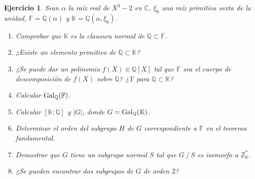 \documentclass[11pt]{report}
\newcommand{\Z}{\mathbb Z}
\newcommand{\Q}{\mathbb Q}
\newcommand{\C}{\mathbb C}
\newcommand{\F}{\mathbb F}
\newcommand{\K}{\mathbb K}
\newtheorem{ejercicio}{Ejercicio}
\begin{document}
\begin{ejercicio}
    Sean $\alpha$ la raíz real de $X^3-2$ en $\C$, $\xi_6$ una raíz primitiva sexta de la unidad, $\F = \Q(\alpha)$ y $\K = \Q(\alpha, \xi_6)$.
    \begin{enumerate}
        \item Comprobar que $\K$ es la clausura normal de $\Q \subset \F$.
        \item ¿Existe un elemento primitivo de $\Q \subset \K$?
        \item ¿Se puede dar un polinomio $f(X) \in \Q[X]$ tal que $\F$ sea el cuerpo de descomposición de $f(X)$ sobre $\Q$? ¿Y para $\Q \subset \K$?
        \item Calcular $\textup{Gal}_\Q(\F)$.
        \item Calcular $[\K \colon \Q]$ y $|G|$, donde $G=\textup{Gal}_\Q(\K)$.
        \item Determinar el orden del subgrupo $H$ de $G$ correspondiente a $\F$ en el teorema fundamental.
        \item Demostrar que $G$ tiene un subgrupo normal $S$ tal que $G \ / \ S$ es isomorfo a $\Z_6^*$.
        \item ¿Se pueden encontrar dos subgrupos de $G$ de orden $2$?
    \end{enumerate}
\end{ejercicio}
\end{document}
